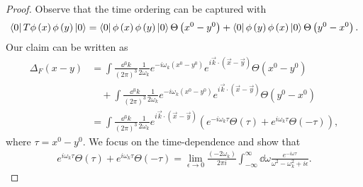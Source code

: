 \begin{proof}
    Observe that the time ordering can be captured with
    \begin{align}
        \bra{0} T \phi \left( x \right) \phi \left( y \right) \ket{0} = \bra{0} \phi \left( x \right) \phi \left( y \right) \ket{0}  \Theta \left( x^{0} - y^{0} \right) + \bra{0} \phi \left( y \right) \phi \left( x \right) \ket{0} \Theta \left( y^{0} - x^{0} \right) 
    .\end{align}
    Our claim can be written as
    \begin{align}
        \Delta_F \left( x -y \right) &= \int \frac{\dd{^{3}k}}{\left( 2\pi \right)^{3}} \frac{1}{2 \omega_k} e^{- i \omega_k \left( x^{0} - y^{0} \right) } e^{i \vec{k} \cdot \left( \vec{x} - \vec{y} \right) } \Theta \left( x^{0} - y^{0} \right)\nonumber\\
                                     &\quad+ \int \frac{\dd{^{3}k}}{\left( 2\pi \right)^{3}} \frac{1}{2 \omega_k} e^{- i \omega_k \left( x^{0} - y^{0} \right) } e^{i \vec{k} \cdot \left( \vec{x} - \vec{y} \right) } \Theta \left( y^{0} - x^{0} \right)   \\
        &= \int \frac{\dd{^3k}}{\left( 2\pi \right)^3} \frac{1}{2 \omega_k} e^{i \vec{k} \cdot \left( \vec{x} - \vec{y} \right) } \left( e^{-i \omega_k \tau} \Theta \left( \tau \right) + e^{i \omega_k \tau} \Theta \left( -\tau \right) \right)
    ,\end{align}
    where $\tau = x^{0} - y^{0}$.  We focus on the time-dependence and show that
    \begin{align}
        e^{i \omega_k \tau} \Theta \left( \tau \right) + e^{i \omega_k \tau} \Theta \left( -\tau \right) = \lim_{\epsilon \to 0} \frac{\left( -2 \omega_k \right) }{2\pi i} \int_{-\infty}^{\infty} \dd{\omega} \frac{e^{-i \omega \tau}}{\omega^2 - \omega^2_k + i \epsilon} 
    .\end{align}


\end{proof}
